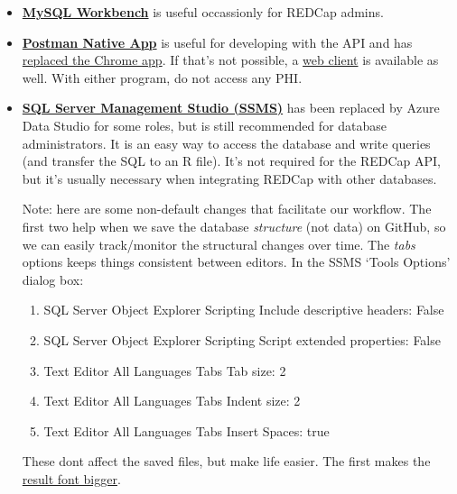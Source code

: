 \documentclass[
]{book}
\providecommand{\tightlist}{%
  \setlength{\itemsep}{0pt}\setlength{\parskip}{0pt}}
\begin{document}
\begin{itemize}
\item
  \textbf{\href{https://dev.mysql.com/downloads/workbench/}{MySQL Workbench}} is useful occassionly for REDCap admins.
\item
  \textbf{\href{https://www.getpostman.com/downloads/}{Postman Native App}} is useful for developing with the API and has \href{https://blog.getpostman.com/2017/03/14/going-native/}{replaced the Chrome app}. If that's not possible, a \href{https://web.postman.co/}{web client} is available as well. With either program, do not access any PHI.
\item
  \textbf{\href{https://docs.microsoft.com/en-us/sql/ssms/download-sql-server-management-studio-ssms}{SQL Server Management Studio (SSMS)}} has been replaced by Azure Data Studio for some roles, but is still recommended for database administrators. It is an easy way to access the database and write queries (and transfer the SQL to an R file). It's not required for the REDCap API, but it's usually necessary when integrating REDCap with other databases.

  Note: here are some non-default changes that facilitate our workflow. The first two help when we save the database \emph{structure} (not data) on GitHub, so we can easily track/monitor the structural changes over time. The \emph{tabs} options keeps things consistent between editors. In the SSMS `Tools \textbar{} Options' dialog box:

  \begin{enumerate}
  \def\labelenumi{\arabic{enumi}.}
  \tightlist
  \item
    SQL Server Object Explorer \textbar{} Scripting \textbar{} Include descriptive headers: False
  \item
    SQL Server Object Explorer \textbar{} Scripting \textbar{} Script extended properties: False
  \item
    Text Editor \textbar{} All Languages \textbar{} Tabs \textbar{} Tab size: 2
  \item
    Text Editor \textbar{} All Languages \textbar{} Tabs \textbar{} Indent size: 2
  \item
    Text Editor \textbar{} All Languages \textbar{} Tabs \textbar{} Insert Spaces: true
  \end{enumerate}

  These dont affect the saved files, but make life easier. The first makes the \href{https://blog.sqlauthority.com/2016/05/31/sql-server-ssms-tip-get-larger-fonts-results-grid-output/}{result font bigger}.


\end{itemize}
\end{document}
